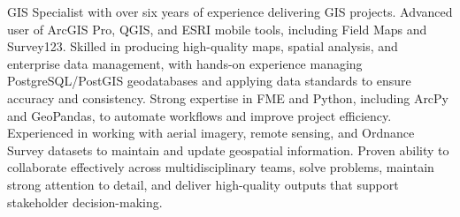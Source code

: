 

\begin{cvparagraph}

GIS Specialist with over six years of experience delivering GIS projects. Advanced user of ArcGIS Pro, QGIS, and ESRI mobile tools, including Field Maps and Survey123. Skilled in producing high-quality maps, spatial analysis, and enterprise data management, with hands-on experience managing PostgreSQL/PostGIS geodatabases and applying data standards to ensure accuracy and consistency. Strong expertise in FME and Python, including ArcPy and GeoPandas, to automate workflows and improve project efficiency. Experienced in working with aerial imagery, remote sensing, and Ordnance Survey datasets to maintain and update geospatial information. Proven ability to collaborate effectively across multidisciplinary teams, solve problems, maintain strong attention to detail, and deliver high-quality outputs that support stakeholder decision-making.
\end{cvparagraph}
